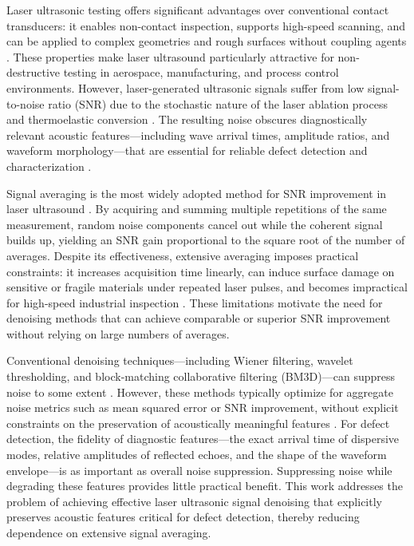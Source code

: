 Laser ultrasonic testing offers significant advantages over conventional contact transducers: it enables non-contact inspection, supports high-speed scanning, and can be applied to complex geometries and rough surfaces without coupling agents \cite{liu2022deep}. These properties make laser ultrasound particularly attractive for non-destructive testing in aerospace, manufacturing, and process control environments. However, laser-generated ultrasonic signals suffer from low signal-to-noise ratio (SNR) due to the stochastic nature of the laser ablation process and thermoelastic conversion \cite{zhang2020deep}. The resulting noise obscures diagnostically relevant acoustic features---including wave arrival times, amplitude ratios, and waveform morphology---that are essential for reliable defect detection and characterization \cite{chen2019wavelet}.

Signal averaging is the most widely adopted method for SNR improvement in laser ultrasound \cite{zhang2020deep}. By acquiring and summing multiple repetitions of the same measurement, random noise components cancel out while the coherent signal builds up, yielding an SNR gain proportional to the square root of the number of averages. Despite its effectiveness, extensive averaging imposes practical constraints: it increases acquisition time linearly, can induce surface damage on sensitive or fragile materials under repeated laser pulses, and becomes impractical for high-speed industrial inspection \cite{yang2023unsupervised}. These limitations motivate the need for denoising methods that can achieve comparable or superior SNR improvement without relying on large numbers of averages.

Conventional denoising techniques---including Wiener filtering, wavelet thresholding, and block-matching collaborative filtering (BM3D)---can suppress noise to some extent \cite{dabov2007bm3d, chen2019wavelet}. However, these methods typically optimize for aggregate noise metrics such as mean squared error or SNR improvement, without explicit constraints on the preservation of acoustically meaningful features \cite{yang2023unsupervised}. For defect detection, the fidelity of diagnostic features---the exact arrival time of dispersive modes, relative amplitudes of reflected echoes, and the shape of the waveform envelope---is as important as overall noise suppression. Suppressing noise while degrading these features provides little practical benefit. This work addresses the problem of achieving effective laser ultrasonic signal denoising that explicitly preserves acoustic features critical for defect detection, thereby reducing dependence on extensive signal averaging.
